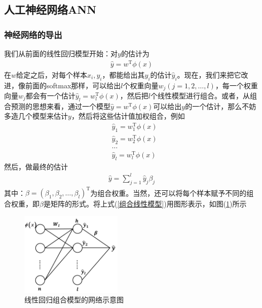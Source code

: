     \subsection{人工神经网络ANN}
        \subsubsection{神经网络的导出}
            \par
            我们从前面的线性回归模型开始：对$y$的估计为
            \begin{align*}
            \hat{y} = w^\mathrm{T}\phi(x)
            \end{align*}
            在$w$给定之后，对每个样本$x_i,y_i$，都能给出其$y_i$的估计$\hat{y}_i$。现在，我们来把它改进，像前面的softmax那样，可以给出$l$个权重向量$w_j(j=1,2,\dots,l)$，每一个权重向量$w_j$都会有一个估计$\hat{y}_l = w_l^\mathrm{T}\phi(x)$，然后把$l$个线性模型进行组合。或者，从组合预测的思想来看，通过一个模型$\hat{y} = w^\mathrm{T}\phi(x)$可以给出$y$的一个估计，那么不妨多造几个模型来估计$y$，然后将这些估计值加权组合，例如
            \begin{align*}
            & \hat{y}_1 = w_1^\mathrm{T}\phi(x)\\
            & \hat{y}_2 = w_2^\mathrm{T}\phi(x)\\
            & \dots\\
            & \hat{y}_l = w_l^\mathrm{T}\phi(x)
            \end{align*}
            然后，做最终的估计
            \begin{align}
            \label{组合线性模型}
            \hat{y} = \sum_{j=1}^l \hat{y}_j \beta_j
            \end{align}
            其中：$\beta = (\beta_1,\beta_2,\dots,\beta_l)^\mathrm{T}$为组合权重。当然，还可以将每个样本赋予不同的组合权重，即$\beta$是矩阵的形式。将上式(\ref{组合线性模型})用图形表示，如图(\ref{fig:线性回归组合模型的网络示意图})所示
            \begin{figure}[H]
            \centering
            \includegraphics[height=4cm]{images/linear_regression_combination_of_network.jpg}
            \caption{线性回归组合模型的网络示意图}
            \label{fig:线性回归组合模型的网络示意图}
            \end{figure}
